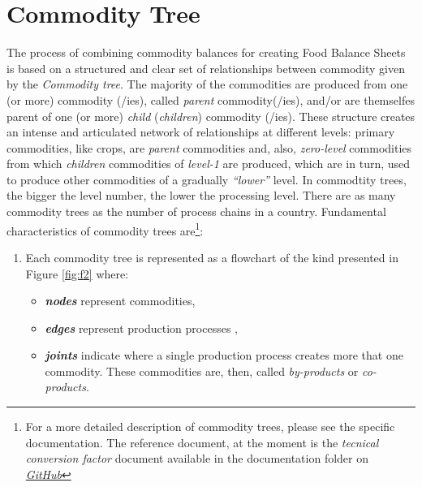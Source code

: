 \documentclass[]{article}
\providecommand{\tightlist}{%
  \setlength{\itemsep}{0pt}\setlength{\parskip}{0pt}}
\let\rmarkdownfootnote\footnote%
\def\footnote{\protect\rmarkdownfootnote}
\begin{document}
\section*{Commodity Tree}\label{commodity-tree}

The process of combining commodity balances for creating Food Balance
Sheets is based on a structured and clear set of relationships between
commodity given by the \emph{Commodity tree}. The majority of the
commodities are produced from one (or more) commodity (/ies), called
\emph{parent} commodity(/ies), and/or are themselfes parent of one (or
more) \emph{child} (\emph{children}) commodity (/ies). These structure
creates an intense and articulated network of relationships at different
levels: primary commodities, like crops, are \emph{parent} commodities
and, also, \emph{zero-level} commodities from which \emph{children}
commodities of \emph{level-1} are produced, which are in turn, used to
produce other commodities of a gradually \emph{``lower''} level. In
commodtity trees, the bigger the level number, the lower the processing
level. There are as many commodity trees as the number of process chains
in a country. Fundamental characteristics of commodity trees
are\footnote{For a more detailed description of commodity trees, please
  see the specific documentation. The reference document, at the moment
  is the \emph{tecnical conversion factor} document available in the
  documentation folder on
  \href{https://github.com/SWS-Methodology/faoswsStandardization/tree/master/documentation}{\emph{GitHub}}}:

\begin{enumerate}
\def\labelenumi{\arabic{enumi}.}
\tightlist
\item
  Each commodity tree is represented as a flowchart of the kind
  presented in Figure \ref{fig:f2} where:

  \begin{itemize}
  \tightlist
  \item
    \textbf{\emph{nodes}} represent commodities,
  \item
    \textbf{\emph{edges}} represent production processes ,
  \item
    \textbf{\emph{joints}} indicate where a single production process
    creates more that one commodity. These commodities are, then, called
    \emph{by-products} or \emph{co-products}.
  \end{itemize}
\end{enumerate}
\end{document}
